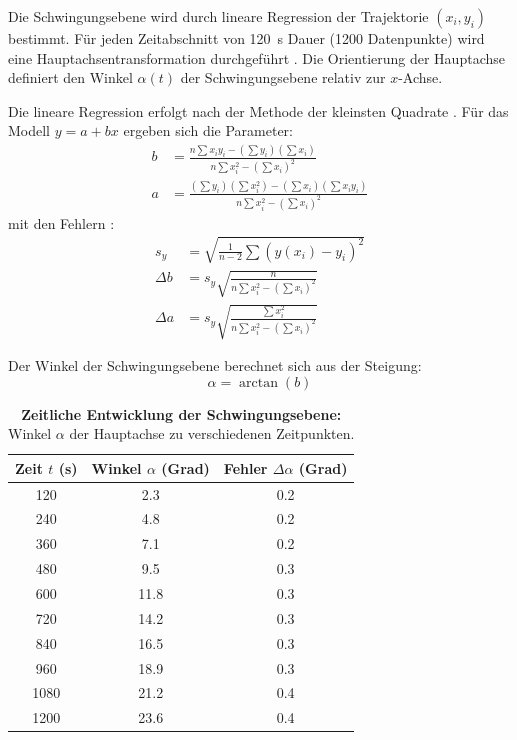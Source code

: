 \documentclass[a4paper,12pt]{article}
\begin{document}
Die Schwingungsebene wird durch lineare Regression der Trajektorie $(x_i, y_i)$ bestimmt. Für jeden Zeitabschnitt von \qty{120}{s} Dauer (1200 Datenpunkte) wird eine Hauptachsentransformation durchgeführt \cite[S.~234]{papula2018}. Die Orientierung der Hauptachse definiert den Winkel $\alpha(t)$ der Schwingungsebene relativ zur $x$-Achse.

Die lineare Regression erfolgt nach der Methode der kleinsten Quadrate \cite[Gl.~22--28, S.~21--22]{mallick2025}. Für das Modell $y = a + bx$ ergeben sich die Parameter:
\begin{align}
b &= \frac{n\sum x_i y_i - (\sum y_i)(\sum x_i)}{n\sum x_i^2-(\sum x_i)^2} \label{eq:steigung}\\
a &= \frac{(\sum y_i)(\sum x_i^2)-(\sum x_i)(\sum x_i y_i)}{n\sum x_i^2-(\sum x_i)^2} \label{eq:achsenabschnitt}
\end{align}
mit den Fehlern \cite[Gl.~26--28, S.~22]{mallick2025}:
\begin{align}
s_y &= \sqrt{\frac{1}{n-2}\sum(y(x_i)-y_i)^2} \label{eq:streuung}\\
\Delta b &= s_y\sqrt{\frac{n}{n\sum x_i^2-(\sum x_i)^2}} \label{eq:fehler_steigung}\\
\Delta a &= s_y\sqrt{\frac{\sum x_i^2}{n\sum x_i^2-(\sum x_i)^2}} \label{eq:fehler_achsenabschnitt}
\end{align}

Der Winkel der Schwingungsebene berechnet sich aus der Steigung:
\begin{equation}
\alpha = \arctan(b)
\label{eq:winkel}
\end{equation}

\begin{table}[h]
\centering
\caption{\textbf{Zeitliche Entwicklung der Schwingungsebene:} Winkel $\alpha$ der Hauptachse zu verschiedenen Zeitpunkten.}
\label{tab:winkel}
\begin{tabular}{ccc}
\toprule
Zeit $t$ (s) & Winkel $\alpha$ (Grad) & Fehler $\Delta\alpha$ (Grad) \\
\midrule
120 & 2.3 & 0.2 \\
240 & 4.8 & 0.2 \\
360 & 7.1 & 0.2 \\
480 & 9.5 & 0.3 \\
600 & 11.8 & 0.3 \\
720 & 14.2 & 0.3 \\
840 & 16.5 & 0.3 \\
960 & 18.9 & 0.3 \\
1080 & 21.2 & 0.4 \\
1200 & 23.6 & 0.4 \\
\bottomrule
\end{tabular}
\end{table}
\end{document}
